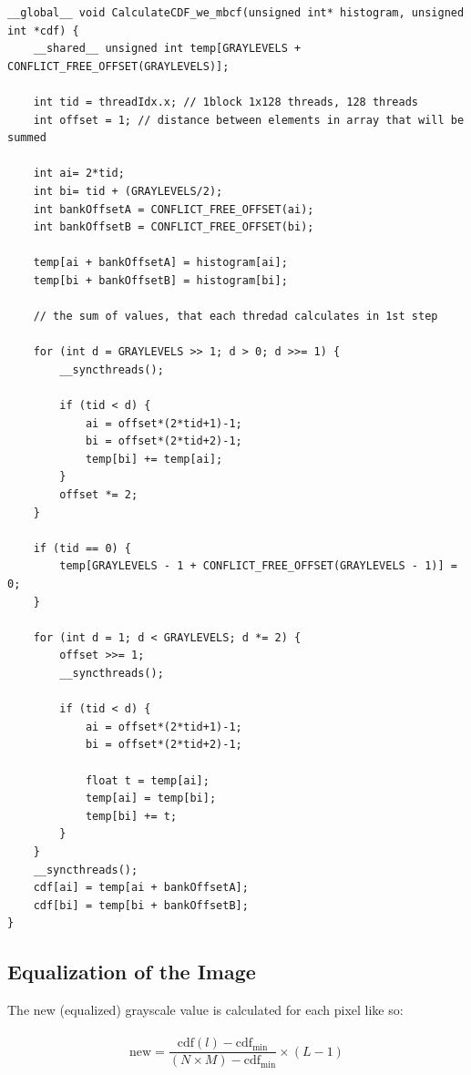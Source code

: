 \documentclass[10pt]{article}
\begin{document}
\begin{lstlisting}[style=cppstyle]
__global__ void CalculateCDF_we_mbcf(unsigned int* histogram, unsigned int *cdf) {
    __shared__ unsigned int temp[GRAYLEVELS + CONFLICT_FREE_OFFSET(GRAYLEVELS)];

    int tid = threadIdx.x; // 1block 1x128 threads, 128 threads 
    int offset = 1; // distance between elements in array that will be summed

    int ai= 2*tid;
    int bi= tid + (GRAYLEVELS/2);
    int bankOffsetA = CONFLICT_FREE_OFFSET(ai);
    int bankOffsetB = CONFLICT_FREE_OFFSET(bi);
    
    temp[ai + bankOffsetA] = histogram[ai];
    temp[bi + bankOffsetB] = histogram[bi];

    // the sum of values, that each thredad calculates in 1st step

    for (int d = GRAYLEVELS >> 1; d > 0; d >>= 1) {
        __syncthreads();

        if (tid < d) {
            ai = offset*(2*tid+1)-1;
            bi = offset*(2*tid+2)-1;
            temp[bi] += temp[ai];
        }
        offset *= 2;
    }

    if (tid == 0) {
        temp[GRAYLEVELS - 1 + CONFLICT_FREE_OFFSET(GRAYLEVELS - 1)] = 0;
    }
    
    for (int d = 1; d < GRAYLEVELS; d *= 2) {
        offset >>= 1;
        __syncthreads();

        if (tid < d) {
            ai = offset*(2*tid+1)-1;
            bi = offset*(2*tid+2)-1;

            float t = temp[ai];
            temp[ai] = temp[bi];
            temp[bi] += t;
        }
    }
    __syncthreads();
    cdf[ai] = temp[ai + bankOffsetA];
    cdf[bi] = temp[bi + bankOffsetB];
}
\end{lstlisting}

\pagebreak

\subsection{Equalization of the Image}
\vspace{0.3cm}
The new (equalized) grayscale value is calculated for each pixel like so:\\\\
\begin{equation*}
    {\text{new}} = \frac{\text{cdf}(l) - \text{cdf}_{\text{min}}}{(N \times M) - \text{cdf}_{\text{min}}} \times (L - 1)
\end{equation*}
\end{document}
